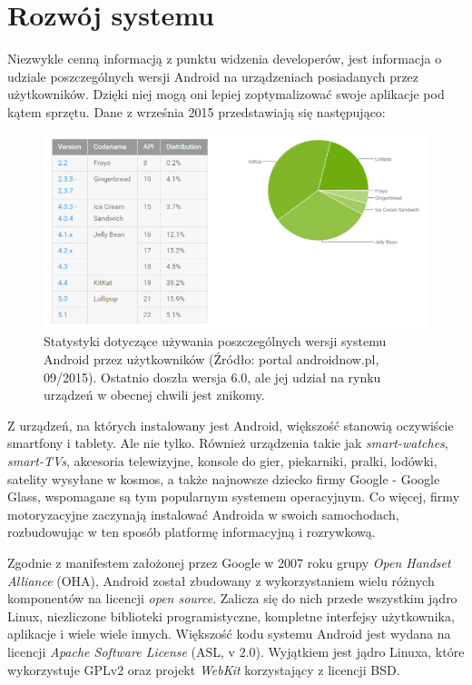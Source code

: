 \newpage

\section{Rozwój systemu}
Niezwykle cenną informacją z punktu widzenia developerów, jest informacja o udziale poszczególnych wersji Android na urządzeniach posiadanych przez użytkowników. Dzięki niej mogą oni lepiej zoptymalizować swoje aplikacje pod kątem sprzętu. Dane z września 2015 przedstawiają się następująco:

\begin{figure}[!htb]
    \centering
    \includegraphics[width=17cm]{imgs/ch2_android_udzial_3.png}
    \caption
{Statystyki dotyczące używania poszczególnych wersji systemu Android przez użytkowników (Źródło: portal androidnow.pl, 09/2015). Ostatnio doszła wersja 6.0, ale jej udział na rynku urządzeń w obecnej chwili jest znikomy.}
    \label{fig:android_udzial_wersje}
\end{figure} 

Z urządzeń, na których instalowany jest Android, większość stanowią oczywiście smartfony i tablety. Ale nie tylko. Również urządzenia takie jak \textit{smart-watches}, \textit{smart-TVs}, akcesoria telewizyjne, konsole do gier, piekarniki, pralki, lodówki, satelity wysyłane w kosmos, a także najnowsze dziecko firmy Google - Google Glass, wspomagane są tym popularnym systemem operacyjnym. Co więcej, firmy motoryzacyjne zaczynają instalować Androida w swoich samochodach, rozbudowując w ten sposób platformę informacyjną i rozrywkową.

Zgodnie z manifestem założonej przez Google w 2007 roku grupy \textit{Open Handset Alliance} (OHA), Android został zbudowany z wykorzystaniem wielu różnych komponentów na licencji \textit{open source}. Zalicza się do nich przede wszystkim jądro Linux, niezliczone biblioteki programistyczne, kompletne interfejsy użytkownika, aplikacje i wiele wiele innych. Większość kodu systemu Android jest wydana na licencji \textit{Apache Software License} (ASL, v 2.0). Wyjątkiem jest jądro Linuxa, które wykorzystuje GPLv2 oraz projekt \textit{WebKit} korzystający z licencji BSD. 

